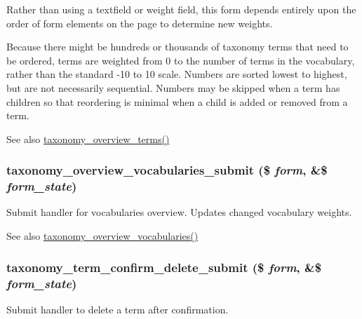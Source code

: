 Rather than using a textfield or weight field, this form depends entirely upon the order of form elements on the page to determine new weights.

Because there might be hundreds or thousands of taxonomy terms that need to be ordered, terms are weighted from 0 to the number of terms in the vocabulary, rather than the standard -\/10 to 10 scale. Numbers are sorted lowest to highest, but are not necessarily sequential. Numbers may be skipped when a term has children so that reordering is minimal when a child is added or removed from a term.

\begin{DoxySeeAlso}{See also}
\hyperlink{group__forms_gac5a4ddd2115e830118c10b98f464a4ab}{taxonomy\_\-overview\_\-terms()} 
\end{DoxySeeAlso}
\hypertarget{taxonomy_8admin_8inc_a2c0c58c11c7f85fa38bab165004f98e2}{
\subsubsection[{taxonomy\_\-overview\_\-vocabularies\_\-submit}]{\setlength{\rightskip}{0pt plus 5cm}taxonomy\_\-overview\_\-vocabularies\_\-submit (\$ {\em form}, \/  \&\$ {\em form\_\-state})}}
\label{taxonomy_8admin_8inc_a2c0c58c11c7f85fa38bab165004f98e2}
Submit handler for vocabularies overview. Updates changed vocabulary weights.

\begin{DoxySeeAlso}{See also}
\hyperlink{group__forms_ga4509184b09d51fc6f3cccbd883cbd4f8}{taxonomy\_\-overview\_\-vocabularies()} 
\end{DoxySeeAlso}
\hypertarget{taxonomy_8admin_8inc_ab96dee24a79d706b4b28d26ceac5e946}{
\subsubsection[{taxonomy\_\-term\_\-confirm\_\-delete\_\-submit}]{\setlength{\rightskip}{0pt plus 5cm}taxonomy\_\-term\_\-confirm\_\-delete\_\-submit (\$ {\em form}, \/  \&\$ {\em form\_\-state})}}
\label{taxonomy_8admin_8inc_ab96dee24a79d706b4b28d26ceac5e946}
Submit handler to delete a term after confirmation.

